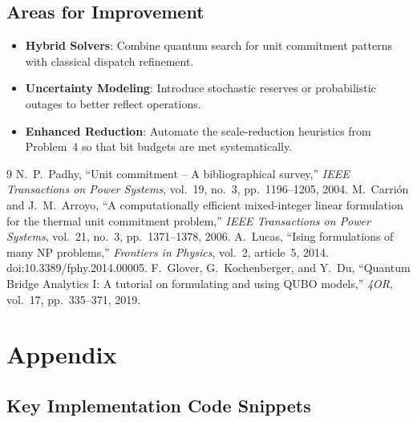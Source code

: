 \documentclass{apmcmthesis}
\begin{document}
\subsection{Areas for Improvement}

\begin{itemize}
\item \textbf{Hybrid Solvers}: Combine quantum search for unit commitment patterns with classical dispatch refinement.

\item \textbf{Uncertainty Modeling}: Introduce stochastic reserves or probabilistic outages to better reflect operations.

\item \textbf{Enhanced Reduction}: Automate the scale-reduction heuristics from Problem~4 so that bit budgets are met systematically.
\end{itemize}

\begin{thebibliography}{9}
 N.~P.~Padhy, ``Unit commitment -- A bibliographical survey,'' \emph{IEEE Transactions on Power Systems}, vol.~19, no.~3, pp.~1196--1205, 2004.
 M.~Carri\'on and J.~M.~Arroyo, ``A computationally efficient mixed-integer linear formulation for the thermal unit commitment problem,'' \emph{IEEE Transactions on Power Systems}, vol.~21, no.~3, pp.~1371--1378, 2006.
 A.~Lucas, ``Ising formulations of many NP problems,'' \emph{Frontiers in Physics}, vol.~2, article~5, 2014. doi:10.3389/fphy.2014.00005.
 F.~Glover, G.~Kochenberger, and Y.~Du, ``Quantum Bridge Analytics I: A tutorial on formulating and using QUBO models,'' \emph{4OR}, vol.~17, pp.~335--371, 2019.
\end{thebibliography}

\newpage

\section{Appendix}

\subsection{Key Implementation Code Snippets}
\end{document}
